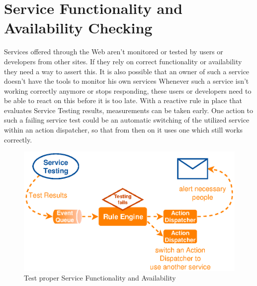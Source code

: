 \section{Service Functionality and Availability Checking}
Services offered through the Web aren't monitored or tested by users or developers from other sites.
If they rely on correct functionality or availability they need a way to assert this.
It is also possible that an owner of such a service doesn't have the tools to monitor his own services
Whenever such a service isn't working correctly anymore or stops responding, these users or developers need to be able to react on this before it is too late.
With a reactive rule in place that evaluates Service Testing results, measurements can be taken early.
One action to such a failing service test could be an automatic switching of the utilized service within an action dispatcher, so that from then on it uses one which still works correctly.
\begin{figure}[!ht]
  \centering
  \includegraphics{figures/ProBinderServiceTesting}
  \caption{Test proper Service Functionality and Availability}
  \label{fig:ProBinderServiceTesting}
\end{figure}



